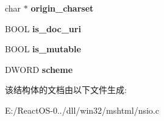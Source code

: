 \begin{DoxyCompactItemize}
\item 
\mbox{\label{structns_wine_u_r_i_ac3ee77ac305689b26e60f426200b438a}} 
char $\ast$ {\bfseries origin\+\_\+charset}
\item 
\mbox{\label{structns_wine_u_r_i_a33a1f693dafa6f85b28e6dd52287ac6c}} 
B\+O\+OL {\bfseries is\+\_\+doc\+\_\+uri}
\item 
\mbox{\label{structns_wine_u_r_i_a2f1257c81c819aa4f218eac578921d43}} 
B\+O\+OL {\bfseries is\+\_\+mutable}
\item 
\mbox{\label{structns_wine_u_r_i_a4fb9db394c81036b21faacd0c9028e85}} 
D\+W\+O\+RD {\bfseries scheme}
\end{DoxyCompactItemize}


该结构体的文档由以下文件生成\+:\begin{DoxyCompactItemize}
\item 
E\+:/\+React\+O\+S-\/0../dll/win32/mshtml/nsio.\+c\end{DoxyCompactItemize}
